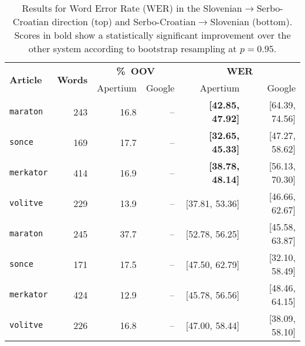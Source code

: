 

\begin{table}
\begin{center}
\begin{tabular}{|l|r|rr||rr|}
   \hline
  \multirow{2}{*}{\textbf{Article}}  & \multirow{2}{*}{\textbf{Words}} & \multicolumn{2}{|c||}{\textbf{\%~OOV}} & \multicolumn{2}{c|}{\textbf{WER}}\\\cline{3-6}
                    &                & Apertium & Google &  Apertium & Google \\
   \hline
   \hline
  \texttt{maraton}  & 243            & 16.8     & --     & \textbf{[42.85, 47.92]} & [64.39, 74.56] \\
  \texttt{sonce}    & 169            & 17.7     & --     & \textbf{[32.65, 45.33]}    & [47.27, 58.62] \\
  \texttt{merkator} & 414            & 16.9     & --     & \textbf{[38.78, 48.14]}     & [56.13, 70.30] \\
  \texttt{volitve}  & 229            & 13.9     & --     & [37.81, 53.36]      & [46.66, 62.67] \\
  \hline
  \hline
  \texttt{maraton}  & 245            & 37.7     & --     & [52.78, 56.25]           & [45.58, 63.87]\\
  \texttt{sonce}    & 171            & 17.5     & --     & [47.50, 62.79]    & [32.10, 58.49] \\
  \texttt{merkator} & 424            & 12.9     & --     & [45.78, 56.56]    & [48.46, 64.15] \\
  \texttt{volitve}  & 226            & 16.8     & --     & [47.00, 58.44]    & [38.09, 58.10]\\

  \hline
\end{tabular}
 \caption{Results for Word Error Rate (WER) in the Slovenian$\rightarrow$Serbo-Croatian direction (top) and Serbo-Croatian$\rightarrow$Slovenian (bottom). Scores in bold show a statistically significant improvement over the other system according to bootstrap resampling at $p = 0.95$.}
\label{table:quantitative1}
\end{center}
\end{table}


